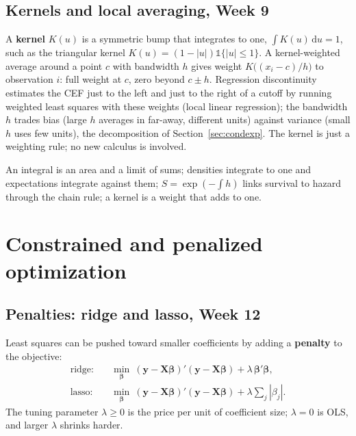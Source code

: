 \documentclass[11pt]{article}
\theoremstyle{definition}
\newcommand{\X}{\bm{X}}
\newcommand{\Y}{\bm{y}}
\newcommand{\bbeta}{\bm{\beta}}
\newcommand{\dd}{\mathrm{d}}
\newcommand{\ind}{\mathds{1}}
\begin{document}
\subsection{Kernels and local averaging, Week 9}

A \textbf{kernel} $K(u)$ is a symmetric bump that integrates to one,
$\int K(u)\,\dd u = 1$, such as the triangular kernel $K(u) = (1 -
|u|)\ind\{|u| \le 1\}$. A kernel-weighted average around a point $c$ with
bandwidth $h$ gives weight $K\big((x_i - c)/h\big)$ to observation $i$:
full weight at $c$, zero beyond $c \pm h$. Regression discontinuity
estimates the CEF just to the left and just to the right of a cutoff by
running weighted least squares with these weights (local linear
regression); the bandwidth $h$ trades bias (large $h$ averages in
far-away, different units) against variance (small $h$ uses few units),
the decomposition of Section~\ref{sec:condexp}. The kernel is just a
weighting rule; no new calculus is involved.

\begin{takeaway}
An integral is an area and a limit of sums; densities integrate to one and
expectations integrate against them; $S = \exp(-\int h)$ links survival to
hazard through the chain rule; a kernel is a weight that adds to one.
\end{takeaway}

\section{Constrained and penalized optimization}
\label{sec:constrained}

\subsection{Penalties: ridge and lasso, Week 12}

Least squares can be pushed toward smaller coefficients by adding a
\textbf{penalty} to the objective:
\begin{align*}
  \text{ridge:}&\quad \min_{\bbeta}\ (\Y - \X\bbeta)'(\Y - \X\bbeta) + \lambda\,\bbeta'\bbeta, \\
  \text{lasso:}&\quad \min_{\bbeta}\ (\Y - \X\bbeta)'(\Y - \X\bbeta) + \lambda\sum_j|\beta_j| .
\end{align*}
The tuning parameter $\lambda \ge 0$ is the price per unit of coefficient
size; $\lambda = 0$ is OLS, and larger $\lambda$ shrinks harder.
\end{document}
